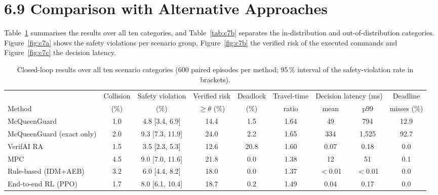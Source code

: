 \documentclass[11pt]{article}
\begin{document}
\section*{6.9 \quad Comparison with Alternative Approaches}
Table~\ref{tab:c7} summarises the results over all ten categories, and Table~\ref{tab:c7b} separates the in-distribution and
out-of-distribution categories. Figure~\ref{fig:c7a} shows the safety violations per scenario group, Figure~\ref{fig:c7b} the verified
risk of the executed commands and Figure~\ref{fig:c7c} the decision latency.

\begin{table}[h]
\centering\small
\caption{Closed-loop results over all ten scenario categories (600 paired episodes per method; 95\,\% interval of the
safety-violation rate in brackets).}\label{tab:c7}
\begin{adjustbox}{max width=\linewidth}
\begin{tabular}{lcccccccc}
\toprule
 & Collision & Safety violation & Verified risk & Deadlock & Travel-time & \multicolumn{2}{c}{Decision latency (ms)} & Deadline \\
Method & (\%) & (\%) & $\ge\theta$ (\%) & (\%) & ratio & mean & p99 & misses (\%) \\
\midrule
McQueenGuard & 1.0 & 4.8 [3.4, 6.9] & 14.4 & 1.5 & 1.64 & 49 & 794 & 12.9 \\
McQueenGuard (exact only) & 2.0 & 9.3 [7.3, 11.9] & 24.0 & 2.2 & 1.65 & 334 & 1,525 & 92.7 \\
VerifAI RA & 1.5 & 3.5 [2.3, 5.3] & 12.6 & 20.8 & 1.60 & 0.07 & 0.18 & 0.0 \\
MPC & 4.5 & 9.0 [7.0, 11.6] & 21.8 & 0.0 & 1.38 & 12 & 51 & 0.1 \\
Rule-based (IDM+AEB) & 3.2 & 6.0 [4.4, 8.2] & 18.0 & 0.0 & 1.37 & $<$0.01 & $<$0.01 & 0.0 \\
End-to-end RL (PPO) & 1.7 & 8.0 [6.1, 10.4] & 18.7 & 0.2 & 1.49 & 0.04 & 0.17 & 0.0 \\
\bottomrule
\end{tabular}
\end{adjustbox}
\end{table}
\end{document}
